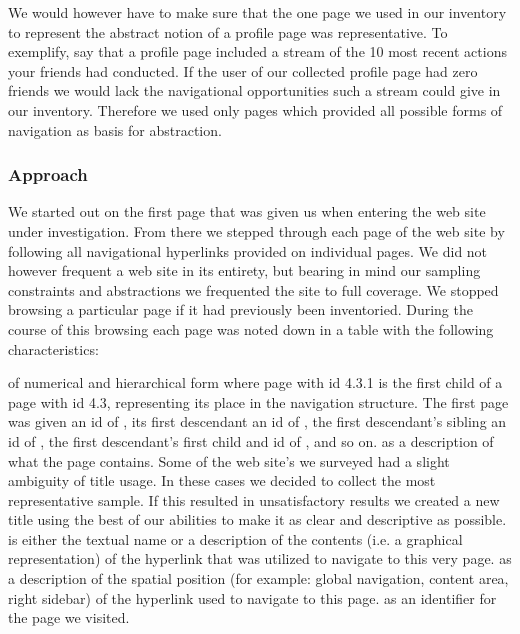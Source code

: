 We would however have to make sure that the one page we used in our inventory
to represent the abstract notion of a profile page was representative. To
exemplify, say that a profile page included a stream of the 10 most recent
actions your friends had conducted. If the user of our collected profile page
had zero friends we would lack the navigational opportunities such a stream
could give in our inventory. Therefore we used only pages which provided
all possible forms of navigation as basis for abstraction.

\subsubsection{Approach}

We started out on the first page that was given us when entering the web site
under investigation. From there we stepped through each page of the web site
by following all navigational hyperlinks provided on individual pages.
We did not however frequent a web site in its entirety, but bearing in mind
our sampling constraints and abstractions we frequented the site to full
coverage. We stopped browsing a particular page if it%
had previously been inventoried. During the course of this browsing
each page was noted down in a table with the following characteristics:

\begin{enum}
   of numerical and hierarchical form where page with id
    4.3.1 is the first child of a page with id 4.3, representing its place in
    the navigation structure. The first page was given an id of ,
    its first descendant an id of , the first descendant's sibling an
    id of , the first descendant's first child and id of , and
    so on.
   as a description of what the page contains. Some of the
    web site's we surveyed had a slight ambiguity of title usage. In these
    cases we decided to collect the most representative sample.%
    If this resulted in unsatisfactory results we created a new title using
    the best of our abilities to make it as clear and descriptive as possible.
   is either the textual name or a description of the
    contents (i.e. a graphical representation) of the hyperlink that was
    utilized to navigate to this very page.
   as a description of the spatial position
    (for example: global navigation, content area, right sidebar) of the
    hyperlink used to navigate to this page.
   as an identifier for the page we visited.
\end{enum}

